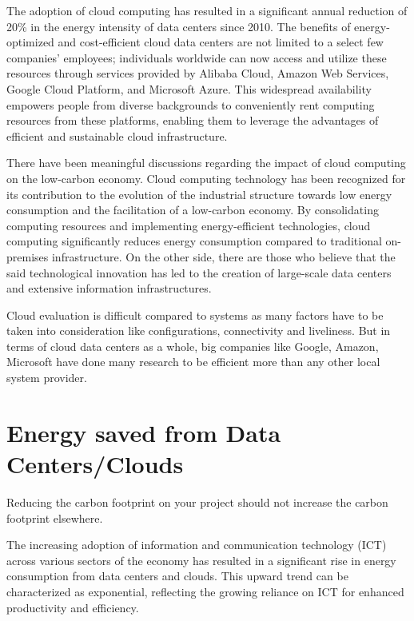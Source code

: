 \documentclass[
  a4paper,  %
  twoside,  %
  bibliography=totoc,
  headsepline,
  cleardoublepage=empty,
  parskip=half,
  draft=false
]{scrbook}
\begin{document}
The adoption of cloud computing has resulted in a significant annual reduction of 20\% in the energy intensity of data centers since 2010. The benefits of energy-optimized and cost-efficient cloud data centers are not limited to a select few companies' employees; individuals worldwide can now access and utilize these resources through services provided by Alibaba Cloud, Amazon Web Services, Google Cloud Platform, and Microsoft Azure. This widespread availability empowers people from diverse backgrounds to conveniently rent computing resources from these platforms, enabling them to leverage the advantages of efficient and sustainable cloud infrastructure\cite{patterson2021carbon}.

There have been meaningful discussions regarding the impact of cloud computing on the low-carbon economy\cite{tao2022can}. Cloud computing technology has been recognized for its contribution to the evolution of the industrial structure towards low energy consumption and the facilitation of a low-carbon economy. By consolidating computing resources and implementing energy-efficient technologies, cloud computing significantly reduces energy consumption compared to traditional on-premises infrastructure\cite{shahbaz2022impact}. On the other side, there are those who believe that the said technological innovation has led to the creation of large-scale data centers and extensive information infrastructures.

Cloud evaluation is difficult compared to systems as many factors have to be taken into consideration like configurations, connectivity and liveliness. But in terms of cloud data centers as a whole, big companies like Google, Amazon, Microsoft have done many research to be efficient  more than any other local system provider\cite{google-datacenters}.


\chapter{Energy saved from Data Centers/Clouds}

Reducing the carbon footprint on your project should not increase the carbon footprint elsewhere.

The increasing adoption of information and communication technology (ICT) across various sectors of the economy has resulted in a significant rise in energy consumption from data centers and clouds. This upward trend can be characterized as exponential, reflecting the growing reliance on ICT for enhanced productivity and efficiency.
\end{document}
